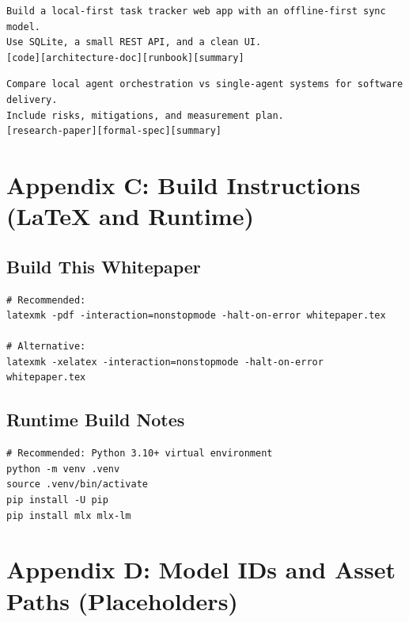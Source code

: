 \documentclass[11pt]{article}
\begin{document}
\begin{lstlisting}[style=base, caption={Sample prompt: multi-output build task}]
Build a local-first task tracker web app with an offline-first sync model.
Use SQLite, a small REST API, and a clean UI.
[code][architecture-doc][runbook][summary]
\end{lstlisting}

\begin{lstlisting}[style=base, caption={Sample prompt: research memo}]
Compare local agent orchestration vs single-agent systems for software delivery.
Include risks, mitigations, and measurement plan.
[research-paper][formal-spec][summary]
\end{lstlisting}

\section{Appendix C: Build Instructions (LaTeX and Runtime)}

\subsection{Build This Whitepaper}

\begin{lstlisting}[style=base, caption={Build commands for the LaTeX PDF}]
# Recommended:
latexmk -pdf -interaction=nonstopmode -halt-on-error whitepaper.tex

# Alternative:
latexmk -xelatex -interaction=nonstopmode -halt-on-error whitepaper.tex
\end{lstlisting}

\subsection{Runtime Build Notes}

\begin{lstlisting}[style=base, caption={Python environment (placeholder)}]
# Recommended: Python 3.10+ virtual environment
python -m venv .venv
source .venv/bin/activate
pip install -U pip
pip install mlx mlx-lm
\end{lstlisting}

\section{Appendix D: Model IDs and Asset Paths (Placeholders)}
\end{document}
